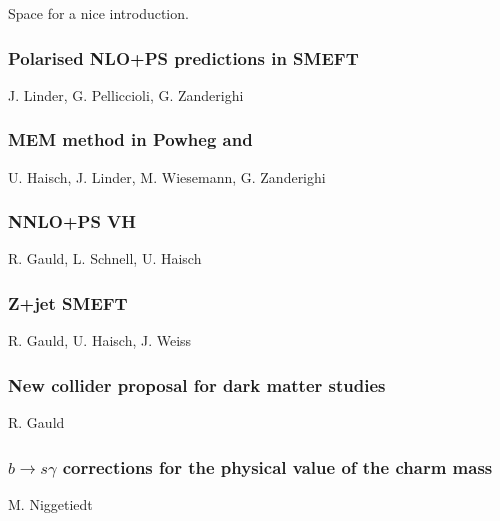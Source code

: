 \documentclass{FBR_Bericht_2025}
\begin{document}
\begin{refsection}
Space for a nice introduction.
%
\subsubsection{Polarised NLO+PS predictions in SMEFT}
\begin{Namen}
J. Linder, G. Pelliccioli, G. Zanderighi
\end{Namen}
%
\subsubsection{MEM method in Powheg and \minnlo{}}
\begin{Namen}
U. Haisch, J. Linder, M. Wiesemann, G. Zanderighi
\end{Namen}
%
\subsubsection{NNLO+PS VH}
\begin{Namen}
R. Gauld, L. Schnell, U. Haisch
\end{Namen}
%
\subsubsection{Z+jet SMEFT}
\begin{Namen}
R. Gauld, U. Haisch, J. Weiss
\end{Namen}
%
\subsubsection{New collider proposal for dark matter studies}
\begin{Namen}
R. Gauld
\end{Namen}
%
\subsubsection{$b\rightarrow s \gamma$ corrections for the physical value of the charm mass}
\begin{Namen}
M. Niggetiedt
\end{Namen}
%
\printbibliography[heading=subbibliography]
\end{refsection}


\clearpage
\onecolumn
\end{document}
